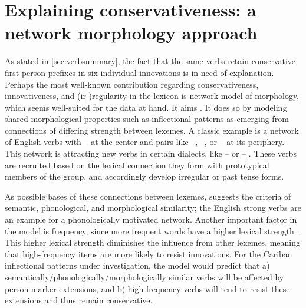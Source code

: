 \section{Explaining conservativeness: a network morphology approach}
\label{sec:motivations}
As stated in \cref{sec:verbsummary}, the fact that the same verbs retain conservative first person prefixes in six individual innovations is in need of explanation.
Perhaps the most well-known contribution regarding conservativeness, innovativeness, and (ir-){}re\-gu\-la\-ri\-ty in the lexicon is  network model of morphology, which seems well-suited for the data at hand.
It aims  \parencite[428]{bybee1995regular}.
It does so by modeling shared morphological properties such as inflectional patterns as emerging from connections of differing strength between lexemes.
A classic example is a network of  English verbs with -- at the center and pairs like --, --, or -- at its periphery.
This network is attracting new verbs in certain dialects, like -- or -- \parencite[129--130]{bybee1985morphology}.
These verbs are recruited based on the lexical connection they form with prototypical members of the group, and accordingly develop irregular or  past tense forms.

As possible bases of these connections between lexemes, \textcite[118]{bybee1985morphology} suggests the criteria of semantic, phonological, and morphological similarity; the English strong verbs are an example for a phonologically motivated network.
Another important factor in the model is frequency, since more frequent words have a higher lexical strength \parencite[119]{bybee1985morphology}.
This higher lexical strength diminishes the influence from other lexemes, meaning that high-frequency items are more likely to resist innovations.
For the Cariban inflectional patterns under investigation, the model would predict that a) semantically\slash{}phonologically\slash\hspace{0pt}morphologically similar verbs will be affected by person marker extensions, and b) high-frequency verbs will tend to resist these extensions and thus remain conservative.

